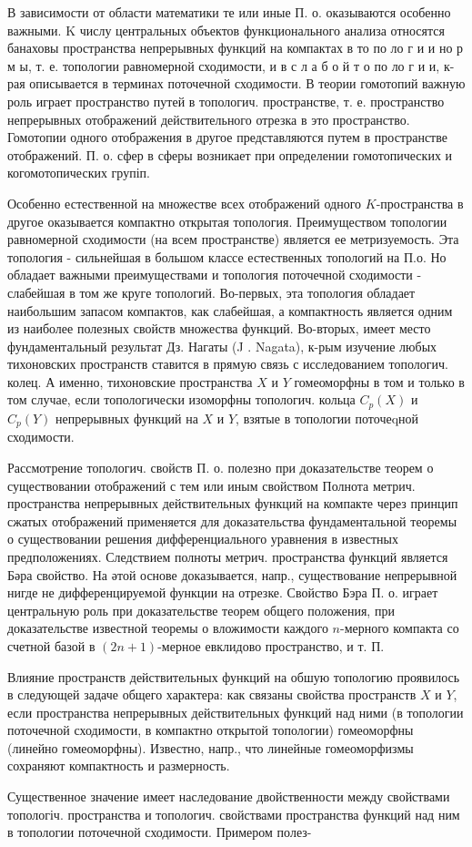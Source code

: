 \documentclass[10pt]{article}
\begin{document}
В зависимости от области математики те или иные П. о. оказываются особенно важными. $\mathrm{K}$ числу центральных объектов функционального анализа относятся банаховы пространства непрерывных функций на компактах в то по ло г и и но р м ы, т. е. топологии равномерной сходимости, и в с л а б о й т о по ло г и и, к-рая описывается в терминах поточечной сходимости. В теории гомотопий важную роль играет пространство путей в топологич. пространстве, т. е. пространство непрерывных отображений действительного отрезка в это пространство. Гомотопии одного отображения в другое представляются путем в пространстве отображений. П. о. сфер в сферы возникает при определении гомотопических и когомотопических групіп.



Особенно естественной на множестве всех отображений одного $K$-пространства в другое оказывается компактно открытая топология. Преимуществом топологии равномерной сходимости (на всем пространстве) является ее метризуемость. Эта топология - сильнейшая в большом классе естественных топологий на П.о. Но обладает важными преимуществами и топология поточечной сходимости - слабейшая в том же круге топологий. Во-первых, эта топология обладает наибольшим запасом компактов, как слабейшая, а компактность является одним из наиболее полезных свойств множества функций. Во-вторых, имеет место фундаментальный результат Дз. Нагаты (J . Nagata), к-рым изучение любых тихоновских пространств ставится в прямую связь с исследованием топологич. колец. А именно, тихоновские пространства $X$ и $Y$ гомеоморфны в том и только в том случае, если топологически изоморфны топологич. кольца $C_{p}(X)$ и $C_{p}(Y)$ непрерывных функций на $X$ и $Y$, взятые в топологии поточеqной сходимости.



Рассмотрение топологич. свойств П. о. полезно при доказательстве теорем о существовании отображений с тем или иным свойством Полнота метрич. пространства непрерывных действительных функций на компакте через принцип сжатых отображений применяется для доказательства фундаментальной теоремы о существовании решения дифференциального уравнения в известных предположениях. Следствием полноты метрич. пространства функций является Бәра свойство. На әтой основе доказывается, напр., существование непрерывной нигде не дифференцируемой функции на отрезке. Свойство Бэра П. о. играет центральную роль при доказательстве теорем общего положения, при доказательстве известной теоремы о вложимости каждого $n$-мерного компакта со счетной базой в $(2 n+1)$-мерное евклидово пространство, и т. П.



Влияние пространств действительных функций на обшую топологию проявилось в следующей задаче общего характера: как связаны свойства пространств $X$ и $Y$, если пространства непрерывных действительных функций над ними (в топологии поточечной сходимости, в компактно открытой топологии) гомеоморфны (линейно гомеоморфны). Известно, напр., что линейные гомеоморфизмы сохраняют компактность и размерность.



Существенное значение имеет наследование двойственности между свойствами топологіч. пространства и топологич. свойствами пространства функций над ним в топологии поточечной сходимости. Примером полез-
\end{document}
